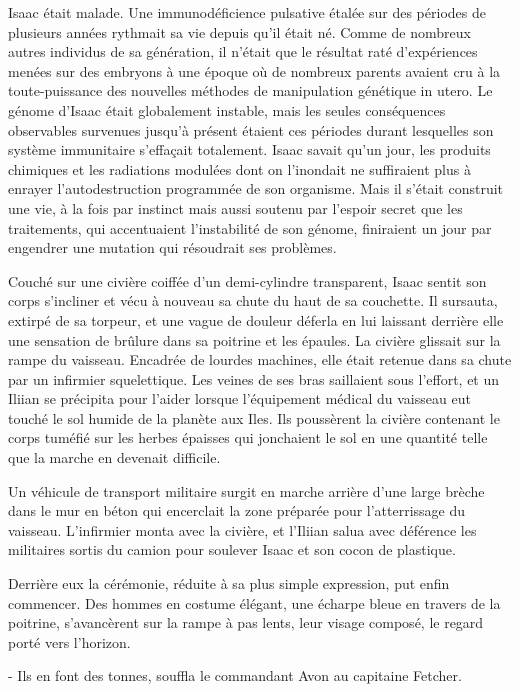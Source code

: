 \documentclass[12pt]{book}
\begin{document}
Isaac était malade. Une immunodéficience pulsative étalée sur des périodes de plusieurs années rythmait sa vie depuis qu'il était né. Comme de nombreux autres individus de sa génération, il n'était que le résultat raté d'expériences menées sur des embryons à une époque où de nombreux parents avaient cru à la toute-puissance des nouvelles méthodes de manipulation génétique in utero. Le génome d'Isaac était globalement instable, mais les seules conséquences observables survenues jusqu'à présent étaient ces périodes durant lesquelles son système immunitaire s'effaçait totalement. Isaac savait qu'un jour, les produits chimiques et les radiations modulées dont on l'inondait ne suffiraient plus à enrayer l'autodestruction programmée de son organisme. Mais il s'était construit une vie, à la fois par instinct mais aussi soutenu par l'espoir secret que les traitements, qui accentuaient l'instabilité de son génome, finiraient un jour par engendrer une mutation qui résoudrait ses problèmes.


Couché sur une civière coiffée d'un demi-cylindre transparent, Isaac sentit son corps s'incliner et vécu à nouveau sa chute du haut de sa couchette. Il sursauta, extirpé de sa torpeur, et une vague de douleur déferla en lui laissant derrière elle une sensation de brûlure dans sa poitrine et les épaules. La civière glissait sur la rampe du vaisseau. Encadrée de lourdes machines, elle était retenue dans sa chute par un infirmier squelettique. Les veines de ses bras saillaient sous l'effort, et un Iliian se précipita pour l'aider lorsque l'équipement médical du vaisseau eut touché le sol humide de la planète aux Iles. Ils poussèrent la civière contenant le corps tuméfié sur les herbes épaisses qui jonchaient le sol en une quantité telle que la marche en devenait difficile.


Un véhicule de transport militaire surgit en marche arrière d'une large brèche dans le mur en béton qui encerclait la zone préparée pour l'atterrissage du vaisseau. L'infirmier monta avec la civière, et l'Iliian salua avec déférence les militaires sortis du camion pour soulever Isaac et son cocon de plastique.


Derrière eux la cérémonie, réduite à sa plus simple expression, put enfin commencer. Des hommes en costume élégant, une écharpe bleue en travers de la poitrine, s'avancèrent sur la rampe à pas lents, leur visage composé, le regard porté vers l'horizon.


- Ils en font des tonnes, souffla le commandant Avon au capitaine Fetcher.
\end{document}
